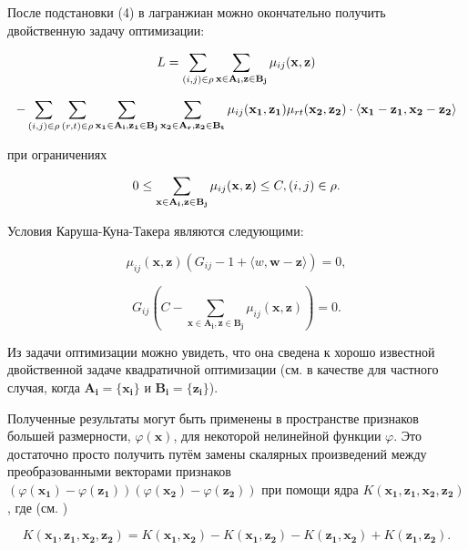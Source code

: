 \documentclass[12pt,a4paper,oneside]{article}
\begin{document}
\par
После подстановки (4) в лагранжиан можно окончательно получить двойственную задачу оптимизации:

\[
L = \sum \limits_{(i, j) \in \mathrm{\rho}} \sum \limits_{\mathbf{x} \in \mathbf{A_i}, \mathbf{z} \in \mathbf{B_j}} \mu_{ij} (\mathbf{x}, \mathbf{z})
\]

\[
- \sum \limits_{(i, j) \in \mathrm{\rho}} \sum \limits_{(r, t) \in \mathrm{\rho}} \sum \limits_{\mathbf{x_1} \in \mathbf{A_i}, \mathbf{z_1} \in \mathbf{B_j}} \sum \limits_{\mathbf{x_2} \in \mathbf{A_r}, \mathbf{z_2} \in \mathbf{B_t}} \mu_{ij} (\mathbf{x_1}, \mathbf{z_1}) \mu_{rt} (\mathbf{x_2}, \mathbf{z_2}) \cdot \langle \mathbf{x_1} - \mathbf{z_1}, \mathbf{x_2} - \mathbf{z_2} \rangle
\]

\par
при ограничениях

\[
0 \leq \sum \limits_{\mathbf{x} \in \mathbf{A_i}, \mathbf{z} \in \mathbf{B_j}} \mu_{ij} (\mathbf{x}, \mathbf{z}) \leq C, (i, j) \in \mathrm{\rho}.
\]

\par
Условия Каруша-Куна-Такера являются следующими:

\[
\mu_{ij} (\mathbf{x}, \mathbf{z}) (G_{ij} - 1 + \langle w, \mathbf{w} - \mathbf{z} \rangle) = 0,
\]

\[
G_{ij} (C - \sum \limits_{\mathbf{x} \in \mathbf{A_i}, \mathbf{z} \in \mathbf{B_j}} \mu_{ij} (\mathbf{x}, \mathbf{z})) = 0.
\]

\par
Из задачи оптимизации можно увидеть, что она сведена к хорошо известной двойственной задаче квадратичной оптимизации (см. в качестве  для частного случая, когда \(\mathbf{A_i} = \{\mathbf{x_i}\}\) и \(\mathbf{B_i} = \{\mathbf{z_i}\}\)). 

\par
Полученные результаты могут быть применены в пространстве признаков большей размерности, \(\varphi(\mathbf{x})\), для некоторой нелинейной функции \(\varphi\). 
Это достаточно просто получить путём замены скалярных произведений между преобразованными векторами признаков \((\varphi(\mathbf{x_1}) - \varphi(\mathbf{z_1})) (\varphi(\mathbf{x_2}) - \varphi(\mathbf{z_2}))\) при помощи ядра \(K(\mathbf{x_1}, \mathbf{z_1}, \mathbf{x_2}, \mathbf{z_2})\), где (см. )

\[
K(\mathbf{x_1}, \mathbf{z_1}, \mathbf{x_2}, \mathbf{z_2}) = K(\mathbf{x_1}, \mathbf{x_2}) - K(\mathbf{x_1}, \mathbf{z_2}) - K(\mathbf{z_1}, \mathbf{x_2}) + K(\mathbf{z_1}, \mathbf{z_2}).
\]
\end{document}
